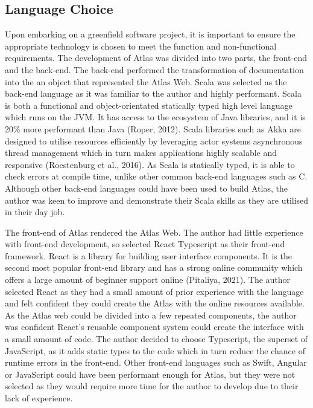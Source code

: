 \documentclass{article}
\begin{document}
\subsection{Language Choice}

Upon embarking on a greenfield software project, it is important to ensure the appropriate technology is chosen to meet the function and non-functional requirements. The development of Atlas was divided into two parts, the front-end and the back-end. The back-end performed the transformation of documentation into the an object that represented the Atlas Web. Scala was selected as the back-end language as it was familiar to the author and highly performant. Scala is both a functional and object-orientated statically typed high level language which runs on the JVM. It has access to the ecosystem of Java libraries, and it is 20\% more performant than Java (Roper, 2012). Scala libraries such as Akka are designed to utilise resources efficiently by leveraging actor systems asynchronous thread management  which in turn makes applications highly scalable and responsive (Roestenburg et al., 2016). As Scala is statically typed, it is able to check errors at compile time, unlike other common back-end languages such as C. Although other back-end languages could have been used to build Atlas, the author was keen to improve and demonstrate their Scala skills as they are utilised in their day job.

The front-end of Atlas rendered the Atlas Web. The author had little experience with front-end development, so selected React Typescript as their front-end framework. React is a library for building user interface components. It is the second most popular front-end library and has a strong online community which offers a large amount of beginner support online (Pitaliya, 2021). The author selected React as they had a small amount of prior experience with the language and felt confident they could create the Atlas with the online resources available. As the Atlas web could be divided into a few repeated components, the author was confident React’s reusable component system could create the interface with a small amount of code. The author decided to choose Typescript, the superset of JavaScript, as it adds static types to the code which in turn reduce the chance of runtime errors in the front-end. Other front-end languages such as Swift, Angular or JavaScript could have been performant enough for Atlas, but they were not selected as they would require more time for the author to develop due to their lack of experience.
\end{document}
